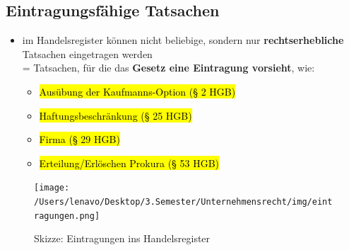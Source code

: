 \documentclass[a4paper, 10pt]{article}
\begin{document}
\subsection{Eintragungsfähige Tatsachen}
\begin{itemize}
    \item im Handelsregister können nicht beliebige, sondern nur \textbf{rechtserhebliche} Tatsachen eingetragen werden\\
     = Tatsachen, für die das \textbf{Gesetz eine Eintragung vorsieht}, wie:
     \begin{itemize}
        \item \hl{Ausübung der Kaufmanns-Option (§ 2 HGB)}
        \item \hl{Haftungsbeschränkung (§ 25 HGB)}
        \item \hl{Firma (§ 29 HGB)}
        \item \hl{Erteilung/Erlöschen Prokura (§ 53 HGB)}
     \end{itemize}
\end{itemize}
\begin{figure}[h]
    \centering
    \texttt{[image: /Users/lenavo/Desktop/3.Semester/Unternehmensrecht/img/eintragungen.png]}
    \caption{Skizze: Eintragungen ins Handelsregister}
    \label{fig:enter-label}
\end{figure}
\end{document}
